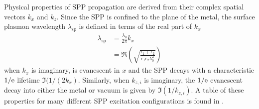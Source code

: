Physical properties of SPP propagation are derived from their complex
spatial vectors $k_x$ and $k_z$.
Since the SPP is confined to the plane of the metal, the surface plasmon
wavelength $\lambda_\text{sp}$ is defined in terms of the real part of
$k_x$
\begin{align}
\lambda_\text{sp} &= \frac{\lambda_0}{2 \pi} k_x\\
& = \Re\left(\sqrt{
  \frac {\epsilon_1+\epsilon_2}
   {\epsilon_1 \epsilon_2 \lambda_0^2}
}\right)
\end{align}
when $k_x$ is imaginary,  is evanescent in
$x$ and the SPP decays with a characteristic $1/{\mathrm{e}}$ lifetime
$\Im(1/(2k_x)$.  Similarly, when $k_{z,i}$ is imaginary, the
$1/{\mathrm{e}}$ evanescent decay into either the metal or vacuum is given by
$\Im(1/k_{z,i})$.  A table of these properties for many different SPP
excitation configurations is found in .
